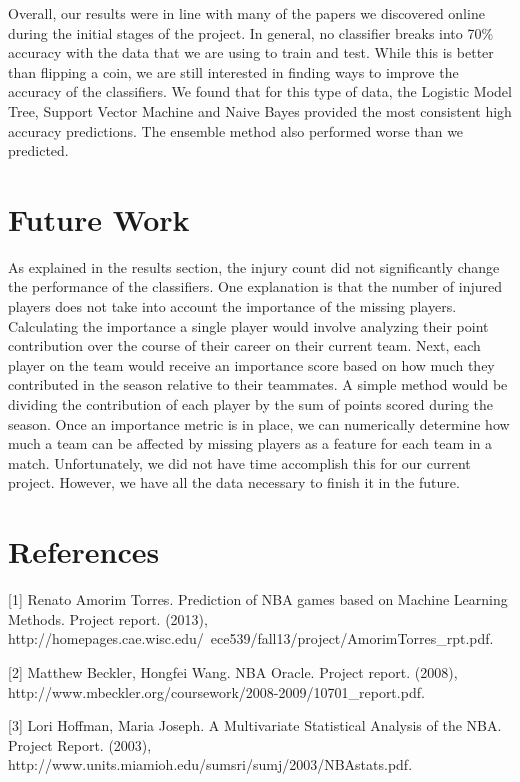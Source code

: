 \documentclass{article}
\begin{document}
Overall, our results were in line with many of the papers we discovered online during the initial stages of the project. In general, no classifier breaks into 70\% accuracy with the data that we are using to train and test. While this is better than flipping a coin, we are still interested in finding ways to improve the accuracy of the classifiers. We found that for this type of data, the Logistic Model Tree, Support Vector Machine and Naive Bayes provided the most consistent high accuracy predictions. The ensemble method also performed worse than we predicted.

\section{Future Work}

As explained in the results section, the injury count did not significantly change the performance of the classifiers. One explanation is that the number of injured players does not take into account the importance of the missing players. Calculating the importance a single player would involve analyzing their point contribution over the course of their career on their current team. Next, each player on the team would receive an importance score based on how much they contributed in the season relative to their teammates. A simple method would be dividing the contribution of each player by the sum of points scored during the season. Once an importance metric is in place, we can numerically determine how much a team can be affected by missing players as a feature for each team in a match. Unfortunately, we did not have time accomplish this for our current project. However, we have all the data necessary to finish it in the future. 

\section*{References}

\small

[1] Renato Amorim Torres. Prediction of NBA games based on Machine Learning Methods. Project report. (2013), http://homepages.cae.wisc.edu/~ece539/fall13/project/AmorimTorres\_rpt.pdf.

[2] Matthew Beckler, Hongfei Wang. NBA Oracle. Project report. (2008), http://www.mbeckler.org/coursework/2008-2009/10701\_report.pdf.

[3] Lori Hoffman, Maria Joseph. A Multivariate Statistical Analysis of the NBA. Project Report. (2003), http://www.units.miamioh.edu/sumsri/sumj/2003/NBAstats.pdf.
\end{document}
